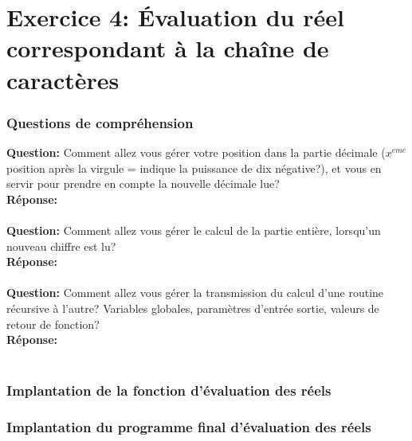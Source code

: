 \documentclass[./standalone.tex]{subfiles}
\begin{document}
\section{Exercice 4: Évaluation du réel correspondant à la chaîne de caractères}
\bigskip

\subsubsection{Questions de compréhension}
\medskip

\textbf{Question:} Comment allez vous gérer votre position dans la partie décimale ($x^{eme}$ position après la virgule = indique la puissance de dix négative?), et vous en servir pour prendre en compte la nouvelle décimale lue? \\

\textbf{Réponse:} \\\\


\textbf{Question:} Comment allez vous gérer le calcul de la partie entière, lorsqu'un nouveau chiffre est lu? \\

\textbf{Réponse:} \\\\

\textbf{Question:} Comment allez vous gérer la transmission du calcul d'une routine récursive à l'autre? Variables globales, paramètres d'entrée sortie, valeurs de retour de fonction?\\

\textbf{Réponse:} \\\\

\subsubsection{Implantation de la fonction d'évaluation des réels}

\subsubsection{Implantation du programme final d'évaluation des réels}
\end{document}

